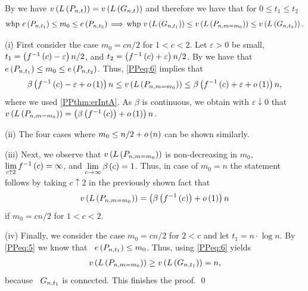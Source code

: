 By  we have $v\left({L\left(P_{n,t}\right)}\right)=v\left({L\left(G_{n,t}\right)}\right)$ and therefore we have that for $0\leq t_1\leq t_2$
\begin{align}\label{PPeq:6}
	\text{\whp}~ \numberEdges{\pro{n}{t_1}}\leq m_0\leq \numberEdges{\pro{n}{t_2}}\hspace{-0.04cm}\implies\hspace{-0.04cm}\text{\whp}~ \numberVertices{\largestcomponent{\er{n}{t_1}}}\leq \numberVertices{\largestcomponent{\acc{n}{m_0}}}\leq \numberVertices{\largestcomponent{\er{n}{t_2}}}.
\end{align}

(i) First consider the case $m_0=cn/2$ for $1<c<2$. Let $\varepsilon>0$ be small, $t_1=\left(f^{-1}\left(c\right)-\varepsilon\right)n/2$, and $t_2=\left(f^{-1}\left(c\right)+\varepsilon\right)n/2$. By  we have that \whp\ $e\left({P_{n,t_1}}\right)\leq m_0\leq e\left({P_{n,t_2}}\right)$. Thus, \eqref{PPeq:6} implies that \whp
\begin{align*}
\beta\left(f^{-1}\left(c\right)-\varepsilon+o\left(1\right)\right)n\leq v\left({L\left(P_{n,m=m_0}\right)}\right)\leq \beta\left(f^{-1}\left(c\right)+\varepsilon+o\left(1\right)\right)n,
\end{align*}
where we used \ref{PPthm:erIntA}. As $\beta$ is continuous, we obtain with $\varepsilon \downarrow 0$ that \whp\ $v\left({L\left(P_{n,m=m_0}\right)}\right)=\left(\beta\left(f^{-1}\left(c\right)\right)+o\left(1\right)\right)n$.

(ii) The four cases where $m_0\leq n/2+o\left(n\right)$ can be shown similarly.

(iii) Next, we observe that $v\left({L\left(P_{n,m=m_0}\right)}\right)$ is non-decreasing in $m_0$, $\lim\limits_{c\uparrow 2}f^{-1}\left(c\right)=\infty$, and $\lim\limits_{c\to\infty}\beta\left(c\right)=1$. Thus, in case of $m_0=n$ the statement follows by taking $c\uparrow 2$ in the previously shown fact that \whp\
\begin{align*}
v\left({L\left(P_{n,m=m_0}\right)}\right)=\left(\beta\left(f^{-1}\left(c\right)\right)+o\left(1\right)\right)n
\end{align*}
if $m_0=cn/2$ for $1<c<2$. 

(iv) Finally, we consider the case $m_0=cn/2$ for $2<c$ and let $t_1=n\cdot \log n$. By \eqref{PPeq:5} we know that \whp\ $e\left({P_{n,t_1}}\right)\leq m_0$. Thus, using \eqref{PPeq:6} yields 
\begin{align*}
v\left({L\left(P_{n,m=m_0}\right)}\right)\geq v\left({L\left(G_{n,t_1}\right)}\right)=n,
\end{align*}
because \whp\ $G_{n,t_1}$ is connected. This finishes the proof. \qed



